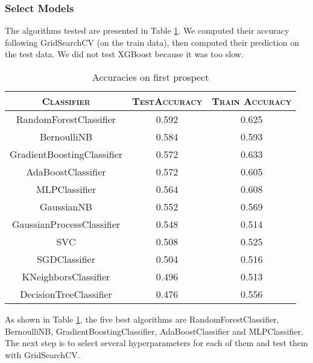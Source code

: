\documentclass[12pt]{article}
\begin{document}
\subsubsection{Select Models}
The algorithms tested are presented in Table \ref{table: all algorithms and accuracies}. We computed their accuracy following GridSearchCV (on the train data), then computed their prediction on the test data. We did not test XGBoost because it was too slow.
\begin{table}[H]
    \centering
    \begin{tabular}{ccc}
        \toprule
        \textsc{Classifier}        & \textsc{TestAccuracy} & \textsc{Train Accuracy} \\ \midrule
        RandomForestClassifier     & 0.592                 & 0.625                   \\
        BernoulliNB                & 0.584                 & 0.593                   \\
        GradientBoostingClassifier & 0.572                 & 0.633                   \\
        AdaBoostClassifier         & 0.572                 & 0.605                   \\
        MLPClassifier              & 0.564                 & 0.608                   \\
        GaussianNB                 & 0.552                 & 0.569                   \\
        GaussianProcessClassifier  & 0.548                 & 0.514                   \\
        SVC                        & 0.508                 & 0.525                   \\
        SGDClassifier              & 0.504                 & 0.516                   \\
        KNeighborsClassifier       & 0.496                 & 0.513                   \\
        DecisionTreeClassifier     & 0.476                 & 0.556                   \\
        \bottomrule
    \end{tabular}
    \caption{Accuracies on first prospect}
    \label{table: all algorithms and accuracies}
\end{table}
As shown in Table \ref{table: all algorithms and accuracies}, the five best algorithms are RandomForestClassifier, BernoulliNB, GradientBoostingClassifier, AdaBoostClassifier and MLPClassifier. The next step is to select several hyperparameters for each of them and test them with GridSearchCV.
\end{document}
